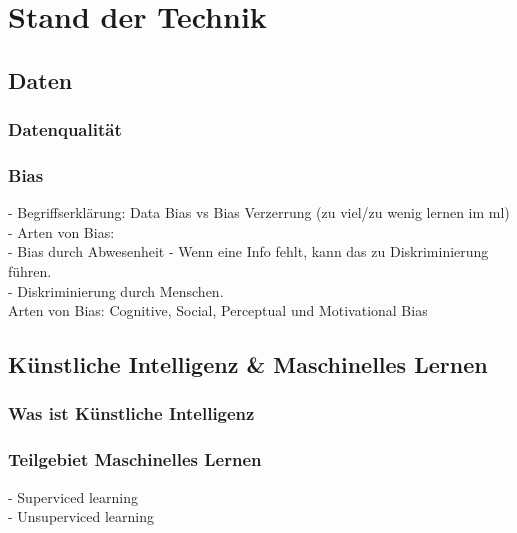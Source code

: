 \chapter{Stand der Technik}
    \begin{onehalfspace}  
        \label{sec:theorie/standdertechnik}

        \section{Daten}
        \label{subsec:daten}
        
        \subsection{Datenqualität}
        \label{subsubsec:datenqualität}

        \subsection{Bias}
        \label{subsubsec:Bias}
            -   Begriffserklärung: Data Bias vs Bias Verzerrung (zu viel/zu wenig lernen im ml)\\
            -   Arten von Bias: \\
                -   Bias durch Abwesenheit - Wenn eine Info fehlt, kann das zu Diskriminierung führen. \\
                -   Diskriminierung durch Menschen. \\
            Arten von Bias: Cognitive, Social, Perceptual und Motivational Bias \cite{8768554}
 
        \section{Künstliche Intelligenz \& Maschinelles Lernen}
        \label{subsec:KIandML}

        \subsection{Was ist Künstliche Intelligenz}
        \label{subsec:wasistKI}

        \subsection{Teilgebiet Maschinelles Lernen}
        \label{subsubsec:teilgebietML}
            -   Superviced learning \\
            -   Unsuperviced learning \\


\end{onehalfspace}
